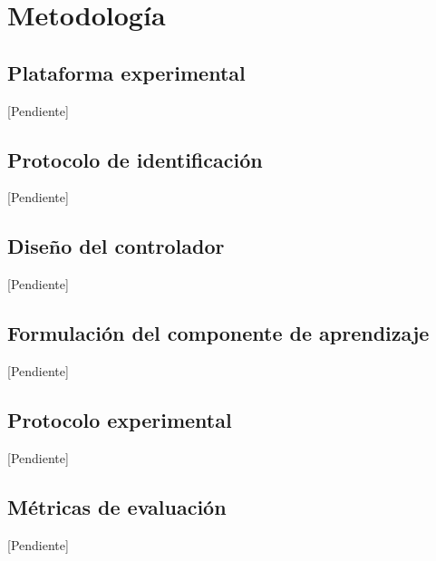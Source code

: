 \chapter{Metodología}
\label{cap:metodologia}

\section{Plataforma experimental}
[Pendiente]

\section{Protocolo de identificación}
[Pendiente]

\section{Diseño del controlador}
[Pendiente]

\section{Formulación del componente de aprendizaje}
[Pendiente]

\section{Protocolo experimental}
[Pendiente]

\section{Métricas de evaluación}
[Pendiente]

